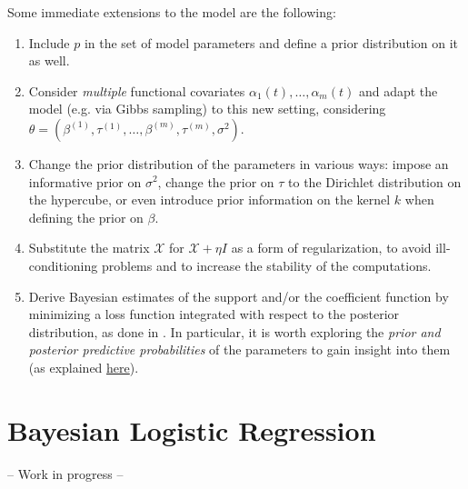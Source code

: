 \documentclass[
  a4paper,
	fontsize=11pt, %
	twoside=false, %
  secnumdepth=2,
	numbers=noenddot, %
]{kaohandt}
\begin{document}
Some immediate extensions to the model are the following:
\begin{enumerate}

  \item Include \(p\) in the set of model parameters and define a prior distribution on it as well.

  \item Consider \textit{multiple} functional covariates \(\alpha_1(t), \dots, \alpha_m(t)\) and adapt the model (e.g. via Gibbs sampling) to this new setting, considering \(\theta=(\beta^{(1)}, \tau^{(1)}, \dots, \beta^{(m)}, \tau^{(m)}, \sigma^2)\).

  \item Change the prior distribution of the parameters in various ways: impose an informative prior on \(\sigma^2\), change the prior on \(\tau\) to the Dirichlet distribution on the hypercube, or even introduce prior information on the kernel \(k\) when defining the prior on \(\beta\).

  \item Substitute the matrix \(\mathcal X\) for \(\mathcal X + \eta I\) as a form of regularization, to avoid ill-conditioning problems and to increase the stability of the computations.

  \item Derive Bayesian estimates of the support and/or the coefficient function by minimizing a loss function integrated with respect to the posterior distribution, as done in . In particular, it is worth exploring the \textit{prior and posterior predictive probabilities} of the parameters to gain insight into them (as explained \href{https://en.wikipedia.org/wiki/Bayesian_inference#Bayesian_prediction}{here}).

\end{enumerate}

\section{Bayesian Logistic Regression}

-- Work in progress --


\renewcommand*{\bibfont}{\small}
\printbibliography[title=Bibliography]%
\end{document}

